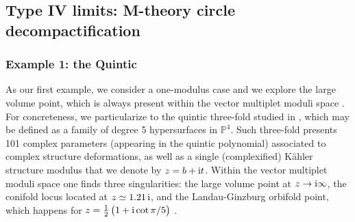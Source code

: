 	
	
	
	
\subsection{Type IV limits: M-theory circle decompactification}
\label{ss:typeIVlimits}
	
\subsubsection{Example 1: the Quintic}
\label{sss:ExampleI}
	
As our first example, we consider a one-modulus case and we explore the large volume point, which is always present within the vector multiplet moduli space \cite{Corvilain:2018lgw}. For concreteness, we particularize to the quintic three-fold studied in \cite{Candelas:1987se,Candelas:1990rm}, which may be defined as a family of degree 5 hypersurfaces in $\mathbb{P}^4$. Such three-fold presents 101 complex parameters (appearing in the quintic polynomial) associated to complex structure deformations, as well as a single (complexified) K\"ahler structure modulus that we denote by $z=b+{\rm i}t$. Within the vector multiplet moduli space one finds three singularities: the large volume point at $z\to {\rm i}\infty$, the conifold locus located at $z \simeq 1.21\, {\rm i}$, and the Landau-Ginzburg orbifold point, which happens for $z = \frac{1}{2} \left( 1+ {\rm i} \cot{\pi/5}\right)$ \cite{Blumenhagen:2018nts}. 
	
